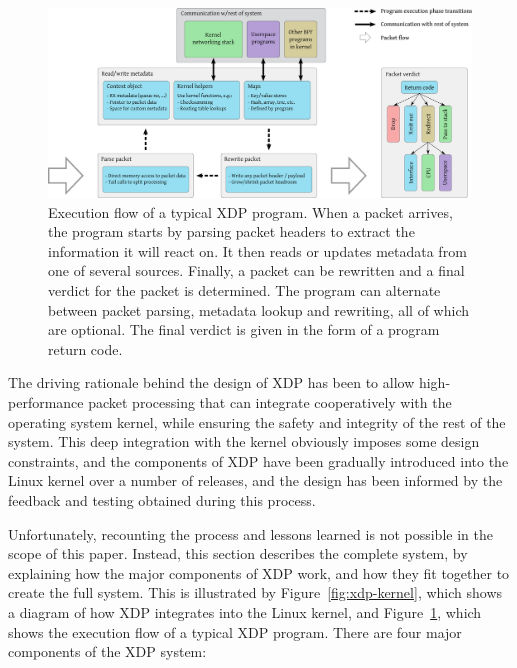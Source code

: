 \documentclass[sigconf]{acmart}
\begin{document}
\begin{figure}[t]
\centering
\includegraphics[width=\linewidth]{figures/xdp-execution-diagram.pdf}
\caption{\label{fig:xdp-execution} Execution flow of a typical XDP program. When
  a packet arrives, the program starts by parsing packet headers to extract the
  information it will react on. It then reads or updates metadata from one of
  several sources. Finally, a packet can be rewritten and a final verdict for
  the packet is determined. The program can alternate between packet parsing,
  metadata lookup and rewriting, all of which are optional. The final verdict is
  given in the form of a program return code.}
\end{figure}



The driving rationale behind the design of XDP has been to allow
high-performance packet processing that can integrate cooperatively with the
operating system kernel, while ensuring the safety and integrity of the rest of
the system. This deep integration with the kernel obviously imposes some design
constraints, and the components of XDP have been gradually introduced into the
Linux kernel over a number of releases, and the design has been informed by the
feedback and testing obtained during this process.

Unfortunately, recounting the process and lessons learned is not possible in the
scope of this paper. Instead, this section describes the complete system, by
explaining how the major components of XDP work, and how they fit together to
create the full system. This is illustrated by Figure~\ref{fig:xdp-kernel},
which shows a diagram of how XDP integrates into the Linux kernel, and
Figure~\ref{fig:xdp-execution}, which shows the execution flow of a typical XDP
program. There are four major components of the XDP system:
\end{document}
